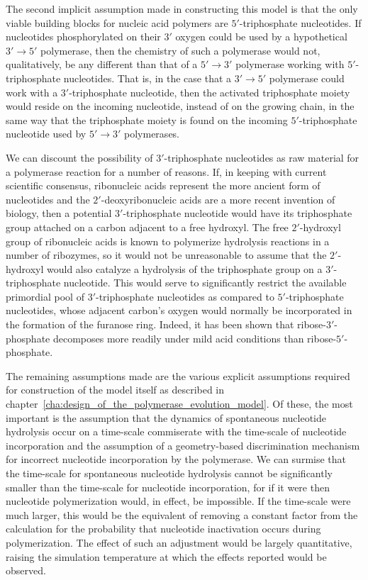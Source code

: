 The second implicit assumption made in constructing this model is that the only viable building blocks for nucleic acid polymers are $5'$-triphosphate nucleotides. If nucleotides phosphorylated on their $3'$ oxygen could be used by a hypothetical $3'\to5'$ polymerase, then the chemistry of such a polymerase would not, qualitatively, be any different than that of a $5'\to3'$ polymerase working with $5'$-triphosphate nucleotides. That is, in the case that a $3'\to5'$ polymerase could work with a $3'$-triphosphate nucleotide, then the activated triphosphate moiety would reside on the incoming nucleotide, instead of on the growing chain, in the same way that the triphosphate moiety is found on the incoming $5'$-triphosphate nucleotide used by $5'\to3'$ polymerases.

We can discount the possibility of $3'$-triphosphate nucleotides as raw material for a polymerase reaction for a number of reasons. If, in keeping with current scientific consensus, ribonucleic acids represent the more ancient form of nucleotides and the $2'$-deoxyribonucleic acids are a more recent invention of biology, then a potential $3'$-triphosphate nucleotide would have its triphosphate group attached on a carbon adjacent to a free hydroxyl. The free $2'$-hydroxyl group of ribonucleic acids is known to polymerize hydrolysis reactions in a number of ribozymes, so it would not be unreasonable to assume that the $2'$-hydroxyl would also catalyze a hydrolysis of the triphosphate group on a $3'$-triphosphate nucleotide. This would serve to significantly restrict the available primordial pool of $3'$-triphosphate nucleotides as compared to $5'$-triphosphate nucleotides, whose adjacent carbon's oxygen would normally be incorporated in the formation of the furanose ring. Indeed, it has been shown that ribose-$3'$-phosphate decomposes more readily under mild acid conditions than ribose-$5'$-phosphate.

The remaining assumptions made are the various explicit assumptions required for construction of the model itself as described in chapter~\ref{cha:design_of_the_polymerase_evolution_model}. Of these, the most important is the assumption that the dynamics of spontaneous nucleotide hydrolysis occur on a time-scale commiserate with the time-scale of nucleotide incorporation and the assumption of a geometry-based discrimination mechanism for incorrect nucleotide incorporation by the polymerase. We can surmise that the time-scale for spontaneous nucleotide hydrolysis cannot be significantly smaller than the time-scale for nucleotide incorporation, for if it were then nucleotide polymerization would, in effect, be impossible. If the time-scale were much larger, this would be the equivalent of removing a constant factor from the calculation for the probability that nucleotide inactivation occurs during polymerization. The effect of such an adjustment would be largely quantitative, raising the simulation temperature at which the effects reported would be observed.

